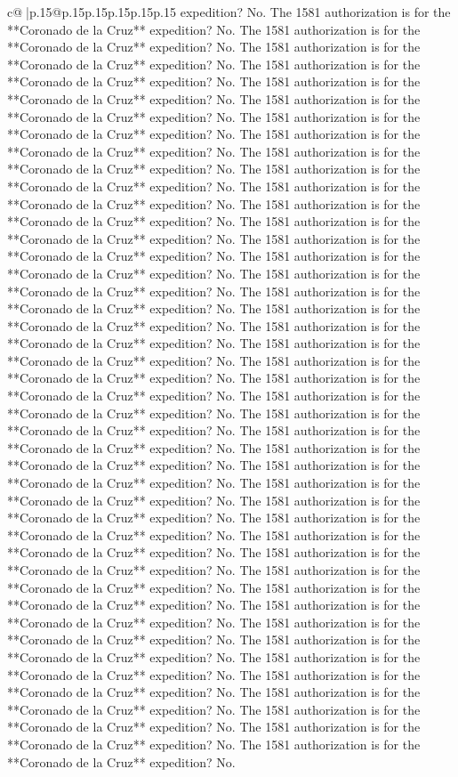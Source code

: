 \documentclass{article}
\begin{document}
{\begin{supertabular}{c@{$\;$}|p{.15\linewidth}@{}p{.15\linewidth}p{.15\linewidth}p{.15\linewidth}p{.15\linewidth}p{.15\linewidth}}
{{{expedition? No. The 1581 authorization is for the **Coronado de la Cruz** expedition? No. The 1581 authorization is for the **Coronado de la Cruz** expedition? No. The 1581 authorization is for the **Coronado de la Cruz** expedition? No. The 1581 authorization is for the **Coronado de la Cruz** expedition? No. The 1581 authorization is for the **Coronado de la Cruz** expedition? No. The 1581 authorization is for the **Coronado de la Cruz** expedition? No. The 1581 authorization is for the **Coronado de la Cruz** expedition? No. The 1581 authorization is for the **Coronado de la Cruz** expedition? No. The 1581 authorization is for the **Coronado de la Cruz** expedition? No. The 1581 authorization is for the **Coronado de la Cruz** expedition? No. The 1581 authorization is for the **Coronado de la Cruz** expedition? No. The 1581 authorization is for the **Coronado de la Cruz** expedition? No. The 1581 authorization is for the **Coronado de la Cruz** expedition? No. The 1581 authorization is for the **Coronado de la Cruz** expedition? No. The 1581 authorization is for the **Coronado de la Cruz** expedition? No. The 1581 authorization is for the **Coronado de la Cruz** expedition? No. The 1581 authorization is for the **Coronado de la Cruz** expedition? No. The 1581 authorization is for the **Coronado de la Cruz** expedition? No. The 1581 authorization is for the **Coronado de la Cruz** expedition? No. The 1581 authorization is for the **Coronado de la Cruz** expedition? No. The 1581 authorization is for the **Coronado de la Cruz** expedition? No. The 1581 authorization is for the **Coronado de la Cruz** expedition? No. The 1581 authorization is for the **Coronado de la Cruz** expedition? No. The 1581 authorization is for the **Coronado de la Cruz** expedition? No. The 1581 authorization is for the **Coronado de la Cruz** expedition? No. The 1581 authorization is for the **Coronado de la Cruz** expedition? No. The 1581 authorization is for the **Coronado de la Cruz** expedition? No. The 1581 authorization is for the **Coronado de la Cruz** expedition? No. The 1581 authorization is for the **Coronado de la Cruz** expedition? No. The 1581 authorization is for the **Coronado de la Cruz** expedition? No. The 1581 authorization is for the **Coronado de la Cruz** expedition? No. The 1581 authorization is for the **Coronado de la Cruz** expedition? No. The 1581 authorization is for the **Coronado de la Cruz** expedition? No. The 1581 authorization is for the **Coronado de la Cruz** expedition? No. The 1581 authorization is for the **Coronado de la Cruz** expedition? No. The 1581 authorization is for the **Coronado de la Cruz** expedition? No. The 1581 authorization is for the **Coronado de la Cruz** expedition? No. The 1581 authorization is for the **Coronado de la Cruz** expedition? No. The 1581 authorization is for the **Coronado de la Cruz** expedition? No. The 1581 authorization is for the **Coronado de la Cruz** expedition? No. The 1581 authorization is for the **Coronado de la Cruz** expedition? No. The 1581 authorization is for the **Coronado de la Cruz** expedition? No. The 1581 authorization is for the **Coronado de la Cruz** expedition? No. }}}
\end{supertabular}}
\end{document}
